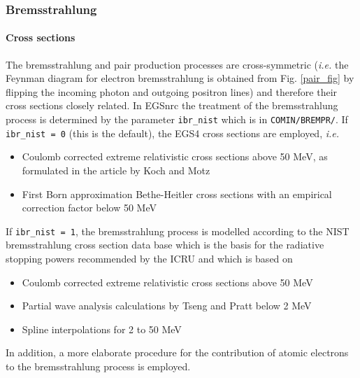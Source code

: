 \subsubsection{Bremsstrahlung}
\setcounter{equation}{0}
\label{bremsstrahlung}

\paragraph{Cross sections} \hfill
{}

The bremsstrahlung and pair production processes are cross-symmetric
({\em i.e.} the Feynman diagram for electron bremsstrahlung is
obtained from Fig. \ref{pair_fig} by flipping the incoming
photon and outgoing positron lines) and therefore their cross sections
closely related. In EGSnrc the treatment of the bremsstrahlung process
is determined by the parameter {\tt ibr\_nist} which is
in {\tt COMIN/BREMPR/}. If {\tt ibr\_nist = 0} (this is the default),
the EGS4 cross sections are employed, {\em i.e.}
\begin{itemize}
\item
Coulomb corrected extreme relativistic cross sections
above 50 MeV, as formulated in the article by Koch and Motz \cite{KM59}
\item
First Born approximation Bethe-Heitler cross sections
with an empirical correction factor below 50 MeV \cite{KM59}
\end{itemize}
If {\tt ibr\_nist = 1}, the bremsstrahlung process is modelled according
to the NIST bremsstrahlung cross section data base \cite{SB85,SB86a} which
is the basis for the radiative stopping powers recommended
by the ICRU \cite{ICRU37} and which is based on
\begin{itemize}
\item
Coulomb corrected extreme relativistic cross sections
above 50 MeV
\item
Partial wave analysis calculations by Tseng and Pratt \cite{TP71}
below 2 MeV
\item
Spline interpolations for 2 to 50 MeV
\end{itemize}
In addition, a more elaborate procedure for the contribution of
atomic electrons to the bremsstrahlung process is employed.

